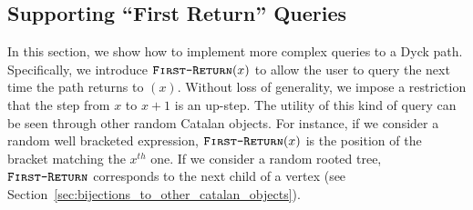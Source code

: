 \subsection{Supporting ``First Return'' Queries}%
\label{sec:supporting_first_return_queries}

In this section, we show how to implement more complex queries to a Dyck path.
Specifically, we introduce $\texttt{\textsc{First-Return}}(x)$ to allow the user to query the next time the path returns to $(x)$.
Without loss of generality, we impose a restriction that the step from $x$ to $x+1$ is an up-step.
The utility of this kind of query can be seen through other random Catalan objects.
For instance, if we consider a random well bracketed expression, $\texttt{\textsc{First-Return}}(x)$ is the position of the bracket matching the $x^{th}$ one.
If we consider a random rooted tree,
$\texttt{\textsc{First-Return}}$ corresponds to the next child of a vertex (see Section~\ref{sec:bijections_to_other_catalan_objects}).




